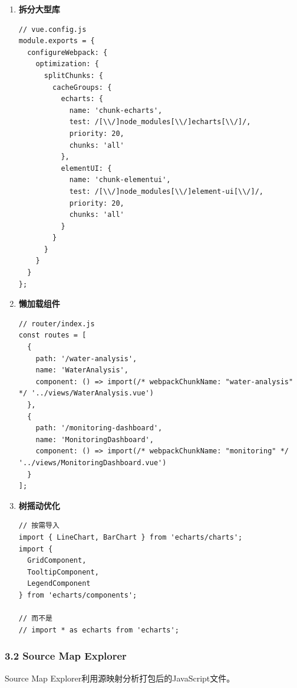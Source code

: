 \begin{enumerate}
\def\labelenumi{\arabic{enumi}.}
\item
  \textbf{拆分大型库}

\begin{lstlisting}
// vue.config.js
module.exports = {
  configureWebpack: {
    optimization: {
      splitChunks: {
        cacheGroups: {
          echarts: {
            name: 'chunk-echarts',
            test: /[\\/]node_modules[\\/]echarts[\\/]/,
            priority: 20,
            chunks: 'all'
          },
          elementUI: {
            name: 'chunk-elementui',
            test: /[\\/]node_modules[\\/]element-ui[\\/]/,
            priority: 20,
            chunks: 'all'
          }
        }
      }
    }
  }
};
\end{lstlisting}
\item
  \textbf{懒加载组件}

\begin{lstlisting}
// router/index.js
const routes = [
  {
    path: '/water-analysis',
    name: 'WaterAnalysis',
    component: () => import(/* webpackChunkName: "water-analysis" */ '../views/WaterAnalysis.vue')
  },
  {
    path: '/monitoring-dashboard',
    name: 'MonitoringDashboard',
    component: () => import(/* webpackChunkName: "monitoring" */ '../views/MonitoringDashboard.vue')
  }
];
\end{lstlisting}
\item
  \textbf{树摇动优化}

\begin{lstlisting}
// 按需导入
import { LineChart, BarChart } from 'echarts/charts';
import { 
  GridComponent,
  TooltipComponent,
  LegendComponent
} from 'echarts/components';

// 而不是
// import * as echarts from 'echarts';
\end{lstlisting}
\end{enumerate}

\subsubsection{3.2 Source Map Explorer}\label{source-map-explorer}

Source Map Explorer利用源映射分析打包后的JavaScript文件。

